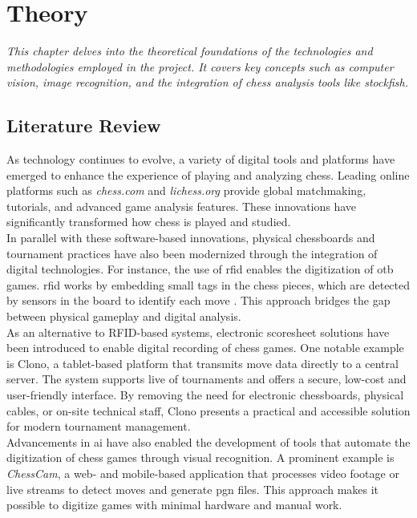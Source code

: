 \chapter{Theory}
\label{chp:theory}

\begin{center}
    \textit{This chapter delves into the theoretical foundations of the technologies and methodologies employed in the project. It covers key concepts such as computer vision, image recognition, and the integration of chess analysis tools like \Gls{stockfish}.}    
\end{center}

\section{Literature Review}
\label{sec:literature-review}

As technology continues to evolve, a variety of digital tools and platforms have emerged to enhance the experience of playing and analyzing chess. Leading online platforms such as \textit{chess.com} and \textit{lichess.org} provide global matchmaking, tutorials, and advanced game analysis features. These innovations have significantly transformed how chess is played and studied. \\

In parallel with these software-based innovations, physical chessboards and tournament practices have also been modernized through the integration of digital technologies. For instance, the use of \gls{rfid} enables the digitization of \gls{otb} games. \gls{rfid} works by embedding small tags in the chess pieces, which are detected by sensors in the board to identify each move \cite{quora:shah}. This approach bridges the gap between physical gameplay and digital analysis. \\

As an alternative to RFID-based systems, electronic scoresheet solutions have been introduced to enable digital recording of chess games. One notable example is Clono, a tablet-based platform that transmits move data directly to a central server. The system supports live of tournaments and offers a secure, low-cost and user-friendly interface. By removing the need for electronic chessboards, physical cables, or on-site technical staff, Clono presents a practical and accessible solution for modern tournament management. \cite{clono} \\

Advancements in \gls{ai} have also enabled the development of tools that automate the digitization of chess games through visual recognition. A prominent example is \textit{ChessCam}, a web- and mobile-based application that processes video footage or live streams to detect moves and generate \gls{pgn} files. This approach makes it possible to digitize games with minimal hardware and manual work. \cite{chess:chesscam, lichess:chesscam}

